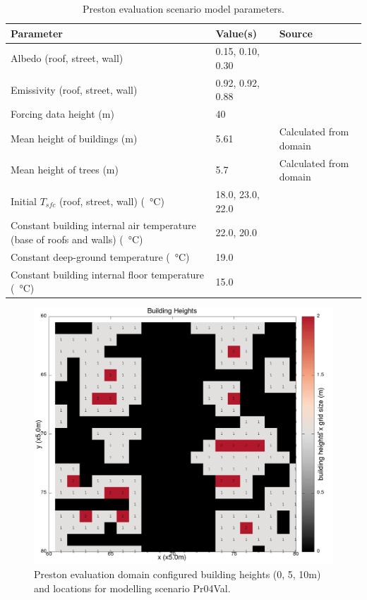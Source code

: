 \documentclass[final,3p,times,authoryear]{elsarticle}
\begin{document}
\begin{table}[!htbp]
\caption{Preston evaluation scenario model parameters. \label{tab:modprvalpara}}     
\begin{tabular}{| p{8.0cm} | l | l|}
\hline
\textbf{Parameter} & \textbf{Value(s)} & \textbf{Source}\\ \hline
Albedo (roof, street, wall)   & 0.15, 0.10, 0.30   & \cite{Krayenhoff2007}\\ \hline
Emissivity (roof, street, wall)   & 0.92, 0.92, 0.88   & \cite{Krayenhoff2007}\\ \hline
Forcing data height (m)  & 40   & \cite{Coutts2007} \\ \hline
Mean height of buildings (m)  & 5.61   & Calculated from domain \\ \hline
Mean height of trees (m)  & 5.7   & Calculated from domain \\ \hline
Initial $T_{sfc}$ (roof, street, wall) (\SI{}{\degreeCelsius})  & 18.0, 23.0, 22.0  & \cite{Krayenhoff2007}  \\ \hline
Constant building internal air temperature (base of roofs and walls) (\SI{}{\degreeCelsius})  & 22.0, 20.0 & \cite{Krayenhoff2007}   \\ \hline
Constant deep-ground temperature (\SI{}{\degreeCelsius})  & 19.0  & \cite{Krayenhoff2007} \\ \hline
Constant building internal floor temperature (\SI{}{\degreeCelsius})  & 15.0  & \cite{Krayenhoff2007} \\ \hline
\end{tabular}
\end{table}

\begin{figure}[!htbp]
\includegraphics[trim = 0mm 0mm 0mm 0mm, clip, scale=0.20]{images/CentralBuildingHeights.png} 
\caption{Preston evaluation domain configured building heights (0, 5, 10m) and locations for modelling scenario Pr04Val.\label{fig:PrestonBldHt}}      
\end{figure}
\end{document}
